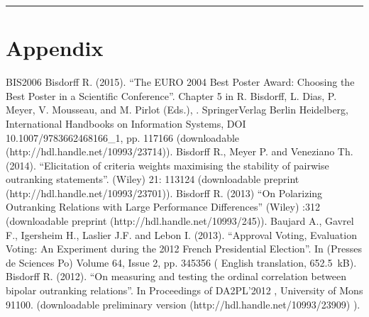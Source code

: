 \documentclass[a4paper,12pt,english]{sphinxhowto}
\begin{document}
\bigskip\hrule\bigskip



\section{Appendix}
\label{\detokenize{pearls:appendix}}
\endgroup

\begin{sphinxthebibliography}{BIS\sphinxhyphen{}2006}
\sphinxAtStartPar
Bisdorff R. (2015). “The EURO 2004 Best Poster Award: Choosing the Best Poster in a Scientific Conference”. Chapter 5 in R. Bisdorff, L. Dias, P. Meyer, V. Mousseau, and M. Pirlot (Eds.), . Springer\sphinxhyphen{}Verlag Berlin Heidelberg, International Handbooks on Information Systems, DOI 10.1007/978\sphinxhyphen{}3\sphinxhyphen{}662\sphinxhyphen{}46816\sphinxhyphen{}6\_1, pp. 117\sphinxhyphen{}166 (downloadable  (http://hdl.handle.net/10993/23714)).
\sphinxAtStartPar
Bisdorff R., Meyer P. and Veneziano Th. (2014). “Elicitation of criteria weights maximising the stability of pairwise outranking statements”.  (Wiley) 21: 113\sphinxhyphen{}124 (downloadable preprint  (http://hdl.handle.net/10993/23701)).
\sphinxAtStartPar
Bisdorff R. (2013) “On Polarizing Outranking Relations with Large Performance Differences”  (Wiley) :3\sphinxhyphen{}12 (downloadable preprint  (http://hdl.handle.net/10993/245)).
\sphinxAtStartPar
Baujard A., Gavrel F., Igersheim H., Laslier J.\sphinxhyphen{}F. and Lebon I. (2013). “Approval Voting, Evaluation Voting: An Experiment during the 2012 French Presidential Election”. In  (Presses de Sciences Po) Volume 64, Issue 2, pp. 345\sphinxhyphen{}356 ( English translation, 652.5 kB).
\sphinxAtStartPar
Bisdorff R. (2012). “On measuring and testing the ordinal correlation between bipolar outranking relations”. In Proceedings of DA2PL’2012 , University of Mons 91\sphinxhyphen{}100. (downloadable preliminary version  (http://hdl.handle.net/10993/23909) ).

\end{sphinxthebibliography}
\end{document}
